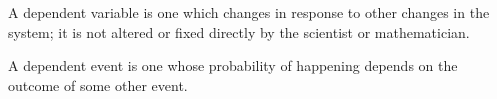 A dependent variable is one which changes in response to
other changes in the system; it is not altered or fixed
directly by the scientist or mathematician.
\par
A dependent event is one whose probability of happening depends
on the outcome of some other event.